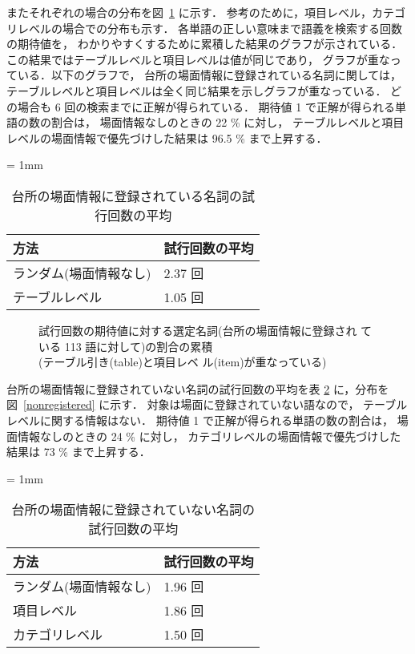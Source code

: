 またそれぞれの場合の分布を図~\ref{registered}
に示す．
参考のために，項目レベル，カテゴリレベルの場合での分布も示す．
各単語の正しい意味まで語義を検索する回数の期待値を，
わかりやすくするために累積した結果のグラフが示されている．
この結果ではテーブルレベルと項目レベルは値が同じであり，
グラフが重なっている．以下のグラフで，
台所の場面情報に登録されている名詞に関しては，
テーブルレベルと項目レベルは全く同じ結果を示しグラフが重なっている．
どの場合も 6 回の検索までに正解が得られている．
期待値 1 で正解が得られる単語の数の割合は，
場面情報なしのときの 22 \% に対し，
テーブルレベルと項目レベルの場面情報で優先づけした結果は 96.5 \% まで上昇する．

\small
\begin{table}
  \vspace{-1.5mm}
  \caption{台所の場面情報に登録されている名詞の試行回数の平均}
  \label{registered_iteration}
  \begin{center}
    \tabcolsep = 1mm
    \begin{tabular}{|l|l|} \hline
方法                   & 試行回数の平均 \\ \hline
ランダム(場面情報なし) & 2.37 回 \\
テーブルレベル         & 1.05 回 \\ \hline
    \end{tabular}
  \vspace{-3.5mm}
  \end{center}
\end{table}
\normalsize

\begin{figure}[p]
  \begin{center}
  \end{center}
  \caption{試行回数の期待値に対する選定名詞(台所の場面情報に登録され
  ている 113 語に対して)の割合の累積\\(テーブル引き(table)と項目レベ
  ル(item)が重なっている)}
  \label{registered}
\end{figure}


台所の場面情報に登録されていない名詞の試行回数の平均を表 \ref{nonregistered_iteration}
に，分布を図~\ref{nonregistered} に示す．
対象は場面に登録されていない語なので，
テーブルレベルに関する情報はない．
期待値 1 で正解が得られる単語の数の割合は，
場面情報なしのときの 24 \% に対し，
カテゴリレベルの場面情報で優先づけした結果は 73 \% まで上昇する．

\small
\begin{table}
  \caption{台所の場面情報に登録されていない名詞の試行回数の平均}
  \label{nonregistered_iteration}
  \begin{center}
    \tabcolsep = 1mm
    \begin{tabular}{|l|l|} \hline
方法                   & 試行回数の平均 \\ \hline
ランダム(場面情報なし) & 1.96 回 \\
項目レベル             & 1.86 回 \\
カテゴリレベル         & 1.50 回 \\ \hline
    \end{tabular}
  \end{center}
\end{table}
\normalsize

